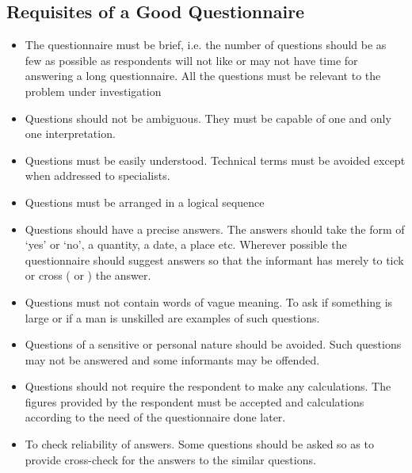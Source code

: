 \documentclass[
10pt, %
a4paper, %
]{report}
\begin{document}
\subsection*{Requisites of a Good Questionnaire}
\begin{itemize}
\item The questionnaire must be brief, i.e. the number of questions
should be as few as possible as respondents will not like or may not have time for answering a long questionnaire. All the questions must be relevant to the problem under investigation
\item Questions should not be ambiguous. They must be capable of
one and only one interpretation.
\item Questions must be easily understood. Technical terms
must be avoided except when addressed to specialists.
\item Questions must be arranged in a logical sequence
\item Questions should have a precise answers. The answers should take the form of ‘yes’ or ‘no’, a quantity, a date, a place etc. Wherever possible the questionnaire should suggest answers so that the informant has merely to tick or cross ( or ) the answer.
\item Questions must not contain words of vague meaning. To ask if something is large or if a man is unskilled are examples of such questions.
\item Questions of a sensitive or personal nature should be avoided. Such questions may not be answered and some informants may be offended.
\item Questions should not require the respondent to make any
calculations. The figures provided by the respondent must
be accepted and calculations according to the need of the
questionnaire done later.
\item To check reliability of answers. Some questions should be
asked so as to provide cross-check for the answers to the
similar questions.
\end{itemize}
\end{document}
